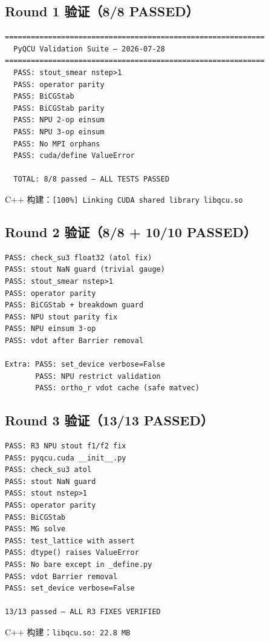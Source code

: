\documentclass[11pt,a4paper]{article}
\begin{document}
\subsection{Round 1 验证（8/8 PASSED）}

\begin{verbatim}
============================================================
  PyQCU Validation Suite — 2026-07-28
============================================================
  PASS: stout_smear nstep>1
  PASS: operator parity
  PASS: BiCGStab
  PASS: BiCGStab parity
  PASS: NPU 2-op einsum
  PASS: NPU 3-op einsum
  PASS: No MPI orphans
  PASS: cuda/define ValueError

  TOTAL: 8/8 passed — ALL TESTS PASSED
\end{verbatim}

C++ 构建：\texttt{[100\%] Linking CUDA shared library libqcu.so} \checkmark

\subsection{Round 2 验证（8/8 + 10/10 PASSED）}

\begin{verbatim}
PASS: check_su3 float32 (atol fix)
PASS: stout NaN guard (trivial gauge)
PASS: stout_smear nstep>1
PASS: operator parity
PASS: BiCGStab + breakdown guard
PASS: NPU stout parity fix
PASS: NPU einsum 3-op
PASS: vdot after Barrier removal

Extra: PASS: set_device verbose=False
       PASS: NPU restrict validation
       PASS: ortho_r vdot cache (safe matvec)
\end{verbatim}

\subsection{Round 3 验证（13/13 PASSED）}

\begin{verbatim}
PASS: R3 NPU stout f1/f2 fix
PASS: pyqcu.cuda __init__.py
PASS: check_su3 atol
PASS: stout NaN guard
PASS: stout nstep>1
PASS: operator parity
PASS: BiCGStab
PASS: MG solve
PASS: test_lattice with assert
PASS: dtype() raises ValueError
PASS: No bare except in _define.py
PASS: vdot Barrier removal
PASS: set_device verbose=False

13/13 passed — ALL R3 FIXES VERIFIED
\end{verbatim}

C++ 构建：\texttt{libqcu.so: 22.8 MB} \checkmark
\end{document}
